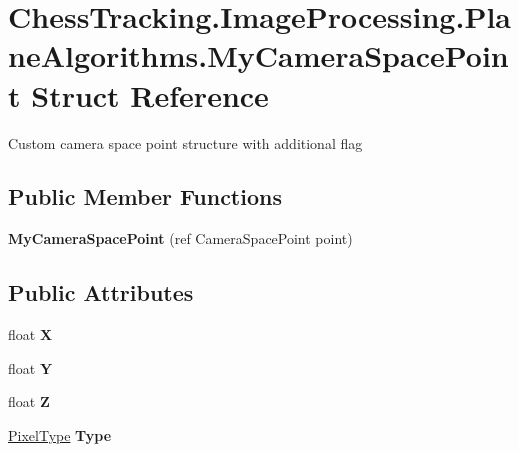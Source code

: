 \hypertarget{struct_chess_tracking_1_1_image_processing_1_1_plane_algorithms_1_1_my_camera_space_point}{}\section{Chess\+Tracking.\+Image\+Processing.\+Plane\+Algorithms.\+My\+Camera\+Space\+Point Struct Reference}
\label{struct_chess_tracking_1_1_image_processing_1_1_plane_algorithms_1_1_my_camera_space_point}


Custom camera space point structure with additional flag  


\subsection*{Public Member Functions}
\begin{DoxyCompactItemize}
\item 
\mbox{\label{struct_chess_tracking_1_1_image_processing_1_1_plane_algorithms_1_1_my_camera_space_point_a5217936aebb5304f1836361729db9f03}} 
{\bfseries My\+Camera\+Space\+Point} (ref Camera\+Space\+Point point)
\end{DoxyCompactItemize}
\subsection*{Public Attributes}
\begin{DoxyCompactItemize}
\item 
\mbox{\label{struct_chess_tracking_1_1_image_processing_1_1_plane_algorithms_1_1_my_camera_space_point_ac06d9d4fe76a4d84f1979385ff5e6961}} 
float {\bfseries X}
\item 
\mbox{\label{struct_chess_tracking_1_1_image_processing_1_1_plane_algorithms_1_1_my_camera_space_point_a4588550e5bae788f78ea04935c944a10}} 
float {\bfseries Y}
\item 
\mbox{\label{struct_chess_tracking_1_1_image_processing_1_1_plane_algorithms_1_1_my_camera_space_point_ae6609f9eb4f7c2d7ca3db51039ec62b6}} 
float {\bfseries Z}
\item 
\mbox{\label{struct_chess_tracking_1_1_image_processing_1_1_plane_algorithms_1_1_my_camera_space_point_ab54e0fbdc88b06439f8dcd789e3c5856}} 
\mbox{\hyperlink{namespace_chess_tracking_1_1_image_processing_1_1_plane_algorithms_ac44a3bcaafd35137cad84c4d148194c1}{Pixel\+Type}} {\bfseries Type}
\end{DoxyCompactItemize}


